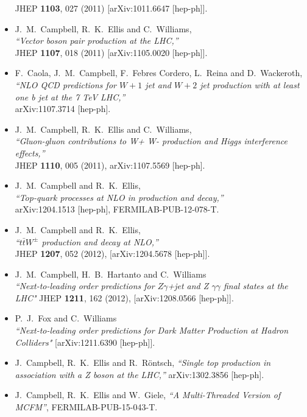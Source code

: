 \documentclass[12pt]{article}
\begin{document}
\begin{itemize}
 JHEP {\bf 1103}, 027 (2011)
  [arXiv:1011.6647 [hep-ph]].
\item J.~M.~Campbell, R.~K.~Ellis and C.~Williams, \\
  {\it ``Vector boson pair production at the LHC,''} \\
  JHEP {\bf 1107}, 018 (2011)
  [arXiv:1105.0020 [hep-ph]]. 
\item F.~Caola, J.~M.~Campbell, F.~Febres Cordero, L.~Reina and D.~Wackeroth, \\
  {\it ``NLO QCD predictions for $W+1$ jet and $W+2$ jet production with at least one b jet at the 7 TeV LHC,''} \\
    arXiv:1107.3714 [hep-ph].
\item J.~M.~Campbell, R.~K.~Ellis and C.~Williams, \\
  {\it ``Gluon-gluon contributions to W+ W- production and Higgs interference effects,''} \\
  JHEP {\bf 1110}, 005 (2011),
  arXiv:1107.5569 [hep-ph].
\item J.~M.~Campbell and R.~K.~Ellis, \\
  {\it ``Top-quark processes at NLO in production and decay,''} \\
  arXiv:1204.1513 [hep-ph], FERMILAB-PUB-12-078-T.
\item J.~M.~Campbell and R.~K.~Ellis, \\
  {\it ``$t \bar{t} W^{\pm}$ production and decay at NLO,''} \\
  JHEP {\bf 1207}, 052 (2012), [arXiv:1204.5678 [hep-ph]].
\item
 J.~M.~Campbell, H.~B.~Hartanto and
                        C.~Williams\\
      {\it {``Next-to-leading order predictions for $Z \gamma$+jet and
                        Z $\gamma \gamma$ final states at the LHC"}}
                        	JHEP {\bf 1211}, 162 (2012), [arXiv:1208.0566 [hep-ph]].	
\item
 P.~J.~Fox  and C.~Williams\\
      {\it {``Next-to-leading order predictions for Dark Matter Production at Hadron Colliders"}}
                        	 [arXiv:1211.6390 [hep-ph]].	 
\item
  J.~Campbell, R.~K.~Ellis and R.~R{\"o}ntsch,
  {\it ``Single top production in association with a Z boson at the LHC,''}
  arXiv:1302.3856 [hep-ph].

\item
  J.~Campbell, R.~K.~Ellis and W.~Giele,
  {\it ``A Multi-Threaded Version of MCFM''},
    FERMILAB-PUB-15-043-T.
\end{itemize}
\end{document}
